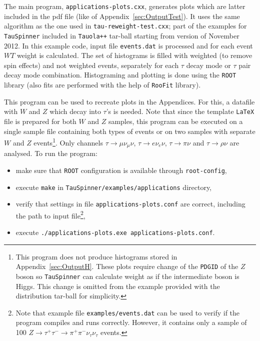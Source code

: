 \documentclass{article}
\begin{document}
The main program, {\tt applications-plots.cxx}, generates plots which are latter included in the pdf file (like of Appendix~\ref{sec:OutputTest}).
It uses the same algorithm as the one used in {\tt tau-reweight-test.cxx}; part of
the examples for {\tt TauSpinner} included in {\tt Tauola++} tar-ball starting
from version of November 2012.
In this example code, input file {\tt events.dat} is processed and for
each event $WT$ weight is calculated. The set of histograms is filled with weighted (to remove spin effects) and not weighted events,
separately for each $\tau$ decay mode or $\tau$ pair decay mode combination.
Histograming and plotting is done using the {\tt ROOT} library \cite{root-install-www} (also fits are performed with the help of
{\tt RooFit} library).

This program can be used to recreate plots in the Appendices. For this, a datafile with $W$ and $Z$ which
decay into $\tau$'s is needed. Note that since the template {\tt LaTeX} file is prepared
for both $W$ and $Z$ samples, this program can be executed on a single sample
file containing both types of events or on two samples with separate $W$
and $Z$ events\footnote{This program does not produce histograms stored in Appendix~\ref{sec:OutputH}. These plots
require change of the {\tt PDGID} of the $Z$ boson so {\tt TauSpinner} can calculate weight as if the intermediate boson is Higgs.
This change is omitted from the example provided with the distribution tar-ball for simplicity.}.
Only channels $\tau \to \mu \nu_\mu \nu$, $\tau \to e \nu_e \nu$, $\tau \to \pi \nu$
and $\tau \to \rho \nu$ are analysed. To run the program:

\begin{itemize}
\item make sure that {\tt ROOT} configuration is available through {\tt root-config},
\item execute {\tt make} in {\tt TauSpinner/examples/applications} directory,
\item verify that settings in file {\tt applications-plots.conf} are correct,
      including the path to input file\footnote{Note 
      that example file {\tt examples/events.dat} can be used to verify
                if the program compiles and runs correctly. However, it contains
                only a sample of 100 $Z \to \tau^+ \tau^- \to \pi^+ \pi^- \nu_\tau \nu_\tau$ events.},
\item execute {\tt ./applications-plots.exe applications-plots.conf}.
\end{itemize}
\end{document}
